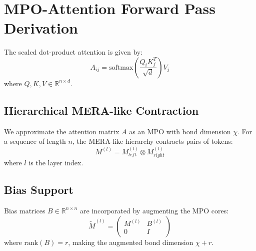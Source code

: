 \documentclass{article}
\begin{document}
\section{MPO-Attention Forward Pass Derivation}

The scaled dot-product attention is given by:
\[
A_{ij} = \text{softmax}\left(\frac{Q_i K_j^T}{\sqrt{d}}\right)V_j
\]
where $Q, K, V \in \mathbb{R}^{n \times d}$.

\subsection{Hierarchical MERA-like Contraction}
We approximate the attention matrix $A$ as an MPO with bond dimension $\chi$.
For a sequence of length $n$, the MERA-like hierarchy contracts pairs of tokens:
\[
M^{(l)} = M_{left}^{(l)} \otimes M_{right}^{(l)}
\]
where $l$ is the layer index.

\subsection{Bias Support}
Bias matrices $B \in \mathbb{R}^{n \times n}$ are incorporated by augmenting the MPO cores:
\[
\tilde{M}^{(l)} = \begin{pmatrix} M^{(l)} & B^{(l)} \\ 0 & I \end{pmatrix}
\]
where $\text{rank}(B)=r$, making the augmented bond dimension $\chi+r$.
\end{document}
